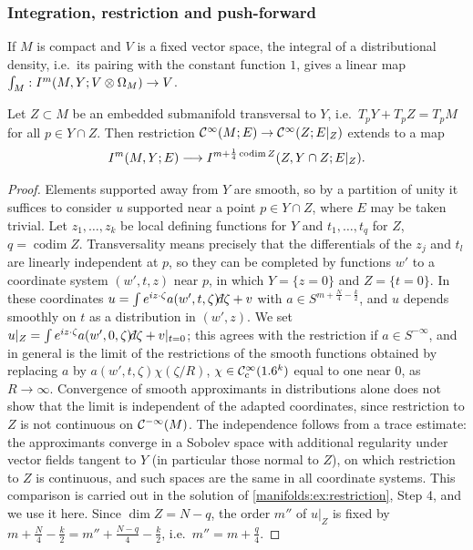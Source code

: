 \subsubsection*{Integration, restriction and push-forward}
If $M$ is compact and $V$ is a fixed vector space, the integral of a
distributional density, i.e.\ its pairing with the constant function $1$, gives
a linear map $\int_M:I^{m}(M,Y;V\otimes\Omega_M)\to V$.

\begin{proposition}\label{manifolds:prop:restriction}
Let $Z\subset M$ be an embedded submanifold transversal to $Y$, i.e.\
$T_pY+T_pZ=T_pM$ for all $p\in Y\cap Z$. Then restriction
$\mathcal{C}^\infty(M;E)\to\mathcal{C}^\infty(Z;E|_Z)$ extends to a map
\begin{equation*}
I^{m}(M,Y;E)\longrightarrow I^{m+\frac14\operatorname{codim}Z}(Z,Y\cap Z;E|_Z).
\end{equation*}
\end{proposition}
\begin{proof}
Elements supported away from $Y$ are smooth, so by a partition of unity it
suffices to consider $u$ supported near a point $p\in Y\cap Z$, where $E$ may be
taken trivial. Let $z_1,\dots,z_k$ be local defining functions for $Y$ and
$t_1,\dots,t_q$ for $Z$, $q=\operatorname{codim}Z$. Transversality means
precisely that the differentials of the $z_j$ and $t_l$ are linearly independent at
$p$, so they can be completed by functions $w'$ to a coordinate system $(w',t,z)$
near $p$, in which $Y=\{z=0\}$ and $Z=\{t=0\}$. In these coordinates
$u=\int e^{iz\cdot\zeta}a(w',t,\zeta)\dbar\zeta+v$ with
$a\in S^{m+\frac N4-\frac k2}$, and $u$ depends smoothly on $t$ as a distribution
in $(w',z)$. We set
$u|_Z=\int e^{iz\cdot\zeta}a(w',0,\zeta)\dbar\zeta+v|_{t=0}$; this agrees with the
restriction if $a\in S^{-\infty}$, and in general is the limit of the restrictions of
the smooth functions obtained by replacing $a$ by $a(w',t,\zeta)\chi(\zeta/R)$,
$\chi\in\mathcal{C}^\infty_{\mathrm{c}}(1.6^k)$ equal to one near $0$, as $R\to\infty$. Convergence of smooth
approximants in distributions alone does not show that the limit is independent of the
adapted coordinates, since restriction to $Z$ is not continuous on $\mathcal{C}^{-\infty}(M)$. The
independence follows from a trace estimate: the approximants converge in a Sobolev
space with additional regularity under vector fields tangent to $Y$ (in particular
those normal to $Z$), on which restriction to $Z$ is continuous, and such spaces are
the same in all coordinate systems. This comparison is carried out in the solution
of \cref{manifolds:ex:restriction}, Step 4, and we use it here. Since $\dim Z=N-q$, the order $m''$ of $u|_Z$ is fixed by
$m+\frac N4-\frac k2=m''+\frac{N-q}4-\frac k2$, i.e.\ $m''=m+\frac q4$.
\end{proof}

